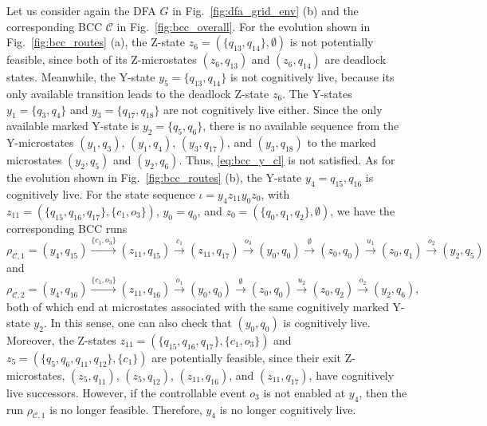 \documentclass[journal,twoside,web]{ieeecolor}
\begin{document}
\begin{example}\label{ex:y_z_prop}
Let us consider again the DFA $G$ in Fig.~\ref{fig:dfa_grid_env} (b) and the corresponding BCC $\mathcal{C}$ in Fig.~\ref{fig:bcc_overall}.
%
For the evolution shown in Fig.~\ref{fig:bcc_routes} (a), the Z-state $z_6 = (\{ q_{13}, q_{14} \}, \emptyset)$ is not potentially feasible, since both of its Z-microstates $(z_6, q_{13})$ and $(z_6, q_{14})$ are deadlock states.
%
Meanwhile, the Y-state $y_5 = \{ q_{13}, q_{14} \}$ is not cognitively live, because its only available transition leads to the deadlock Z-state $z_6$.
The Y-states $y_1 = \{ q_{3}, q_{4} \}$ and $y_3 = \{ q_{17}, q_{18} \}$ are not cognitively live either.
Since the only available marked Y-state is $y_2 = \{ q_5, q_6 \}$, there is no available sequence from the Y-microstates  $(y_1, q_3)$, $(y_1, q_4)$, $(y_3, q_{17})$, and $(y_3, q_{18})$ to the marked microstates $(y_2, q_5)$ and $(y_2, q_6)$. 
Thus, \eqref{eq:bcc_y_cl} is not satisfied.
%
As for the evolution shown in Fig.~\ref{fig:bcc_routes} (b), the Y-state $y_4 = { q_{15}, q_{16} }$ is cognitively live.
For the state sequence $\iota = y_4 z_{11} y_0 z_0$, with $z_{11} = (\{ q_{15}, q_{16}, q_{17}\}, \{c_1, o_3\})$, $y_0 = {q_0}$, and $z_0 = (\{ q_0, q_1, q_2 \}, \emptyset)$, we have the corresponding BCC runs
$
\rho_{\mathcal{C}, 1} = (y_4, q_{15}) \xrightarrow{\{c_1, o_3\}} (z_{11}, q_{15}) \xrightarrow{c_1} (z_{11}, q_{17}) \xrightarrow{o_3} (y_0, q_0) \xrightarrow{\emptyset} (z_0, q_0) \xrightarrow{u_1} (z_0, q_1) \xrightarrow{o_2} (y_2, q_5)
$
and
$
\rho_{\mathcal{C}, 2} = (y_4, q_{16}) \xrightarrow{\{c_1, o_3\}} (z_{11}, q_{16}) \xrightarrow{o_1} (y_0, q_0) \xrightarrow{\emptyset} (z_0, q_0) \xrightarrow{u_2} (z_0, q_2) \xrightarrow{o_2} (y_2, q_6),
$
both of which end at microstates associated with the same cognitively marked Y-state $y_2$.
%
In this sense, one can also check that $(y_0, q_0)$ is cognitively live.
Moreover, the Z-states $z_{11} = (\{ q_{15}, q_{16}, q_{17}\}, \{c_1, o_3\})$ and $z_5 = (\{q_5, q_6, q_{11}, q_{12}\}, \{ c_1 \})$ are potentially feasible, since their exit Z-microstates, $(z_5, q_{11})$, $(z_5, q_{12})$, $(z_{11}, q_{16})$, and $(z_{11}, q_{17})$, have cognitively live successors.
However, if the controllable event $o_3$ is not enabled at $y_4$, then the run $\rho_{\mathcal{C}, 1}$ is no longer feasible.
Therefore, $y_4$ is no longer cognitively live.
%  
%
%
\end{example}
\end{document}
